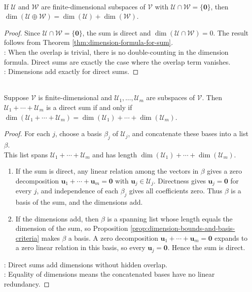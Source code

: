 \begin{corollary} \label{cor:dimension-direct-sum} \\
If $\mathcal{U}$ and $\mathcal{W}$ are finite-dimensional subspaces of $\mathcal{V}$ with $\mathcal{U} \cap \mathcal{W} = \{ \mathbf{0} \}$, then $\dim(\mathcal{U} \oplus \mathcal{W}) = \dim(\mathcal{U}) + \dim(\mathcal{W})$.
\begin{proof}
Since $\mathcal{U}\cap\mathcal{W}=\{\mathbf{0}\}$, the sum is direct and $\dim(\mathcal{U}\cap\mathcal{W})=0$. The result follows from Theorem \ref{thm:dimension-formula-for-sum}.\\
: When the overlap is trivial, there is no double-counting in the dimension formula. Direct sums are exactly the case where the overlap term vanishes.\\
: Dimensions add exactly for direct sums.
\end{proof}
\end{corollary}

\begin{theorem} \label{thm:direct-sum-iff-dimensions-add} \\
Suppose $\mathcal{V}$ is finite-dimensional and $\mathcal{U}_1,\ldots,\mathcal{U}_m$ are subspaces of $\mathcal{V}$. Then $\mathcal{U}_1+\cdots+\mathcal{U}_m$ is a direct sum if and only if $\dim(\mathcal{U}_1+\cdots+\mathcal{U}_m) = \dim(\mathcal{U}_1)+\cdots+\dim(\mathcal{U}_m)$.
\begin{proof}
For each $j$, choose a basis $\beta_j$ of $\mathcal{U}_j$, and concatenate these bases into a list $\beta$.\\
This list spans $\mathcal{U}_1+\cdots+\mathcal{U}_m$ and has length $\dim(\mathcal{U}_1)+\cdots+\dim(\mathcal{U}_m)$.
\begin{enumerate}[label=(\roman*)]
\setlength{\itemsep}{0pt}
\item[$(\Rightarrow)$] If the sum is direct, any linear relation among the vectors in $\beta$ gives a zero decomposition $\mathbf{u}_1+\cdots+\mathbf{u}_m=\mathbf{0}$ with $\mathbf{u}_j\in\mathcal{U}_j$. Directness gives $\mathbf{u}_j=\mathbf{0}$ for every $j$, and independence of each $\beta_j$ gives all coefficients zero. Thus $\beta$ is a basis of the sum, and the dimensions add.
\item[$(\Leftarrow)$] If the dimensions add, then $\beta$ is a spanning list whose length equals the dimension of the sum, so Proposition \ref{prop:dimension-bounds-and-basis-criteria} makes $\beta$ a basis. A zero decomposition $\mathbf{u}_1+\cdots+\mathbf{u}_m=\mathbf{0}$ expands to a zero linear relation in this basis, so every $\mathbf{u}_j=\mathbf{0}$. Hence the sum is direct.
\end{enumerate}
: Direct sums add dimensions without hidden overlap.\\
: Equality of dimensions means the concatenated bases have no linear redundancy.
\end{proof}
\end{theorem}

